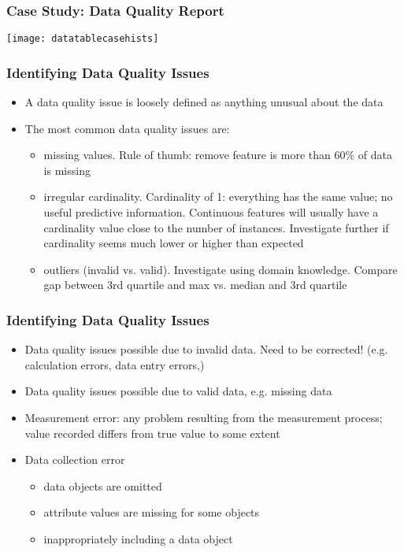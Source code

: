 \begin{frame}[fragile] \frametitle{Case Study: Data Quality Report}

\begin{center}
\texttt{[image: datatablecasehists]}
\end{center}
\end{frame}

\begin{frame}[fragile] \frametitle{Identifying Data Quality Issues}
\begin{itemize}
\item A data quality issue is loosely defined as anything unusual about the data 
\item The most common data quality issues are: 
	\begin{itemize}
	\item missing values. Rule of thumb: remove feature is more than 60\% of data is missing
	\item irregular cardinality. Cardinality of 1: everything has the same value; no useful predictive information. Continuous features will usually have a cardinality value close to the number of instances. Investigate further if cardinality seems much lower or higher than expected
	\item outliers (invalid vs. valid). Investigate using domain knowledge. Compare gap between 3rd quartile and max vs. median and 3rd quartile
	\end{itemize}
\end{itemize}
\end{frame}


\begin{frame}[fragile] \frametitle{Identifying Data Quality Issues}
\begin{itemize}
\item Data quality issues possible due to invalid data. Need to be corrected! (e.g. calculation errors, data entry errors,) 
\item Data quality issues possible due to valid data, e.g. missing data
\item Measurement error: any problem resulting from the measurement process; value recorded differs from true value to some extent
\item Data collection error
	\begin{itemize}
	\item data objects are omitted
	\item attribute values are missing for some objects
	\item inappropriately including a data object
	\end{itemize}
\end{itemize}
\end{frame}


